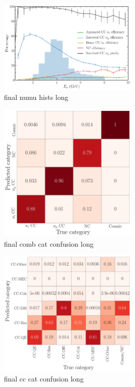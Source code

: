 \begin{figure} %
    \includegraphics[width=0.6\textwidth]{diagrams/7-cvn/chipsnet/final_numu_hists.pdf}
    \caption[final numu hists short]
    {final numu hists long}
    \label{fig:final_numu_hists}
\end{figure}

\begin{figure} %
    \includegraphics[width=0.6\textwidth]{diagrams/7-cvn/chipsnet/final_comb_cat_confusion.pdf}
    \caption[final comb cat confusion short]
    {final comb cat confusion long}
    \label{fig:final_comb_cat_confusion}
\end{figure}

\begin{figure} %
    \includegraphics[width=0.6\textwidth]{diagrams/7-cvn/chipsnet/final_cc_cat_confusion.pdf}
    \caption[final cc cat confusion short]
    {final cc cat confusion long}
    \label{fig:final_cc_cat_confusion}
\end{figure}

